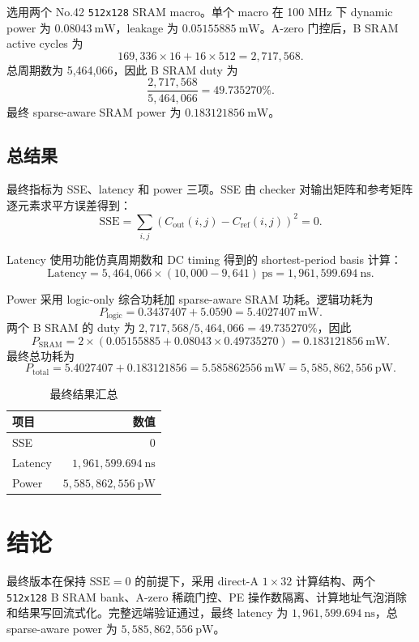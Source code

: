 \documentclass[UTF8,a4paper,zihao=-4]{ctexart}
\begin{document}
选用两个 No.42 \texttt{512x128} SRAM macro。单个 macro 在 100 MHz 下 dynamic power 为 $0.08043\ \mathrm{mW}$，leakage 为 $0.05155885\ \mathrm{mW}$。A-zero 门控后，B SRAM active cycles 为
\begin{equation}
  169{,}336\times16 + 16\times512 = 2{,}717{,}568.
\end{equation}
总周期数为 5,464,066，因此 B SRAM duty 为
\begin{equation}
  \frac{2{,}717{,}568}{5{,}464{,}066} = 49.735270\%.
\end{equation}
最终 sparse-aware SRAM power 为 $0.183121856\ \mathrm{mW}$。

\subsection{总结果}

最终指标为 SSE、latency 和 power 三项。SSE 由 checker 对输出矩阵和参考矩阵逐元素求平方误差得到：
\begin{equation}
  \mathrm{SSE}=\sum_{i,j}\left(C_{\mathrm{out}}(i,j)-C_{\mathrm{ref}}(i,j)\right)^2=0.
\end{equation}

Latency 使用功能仿真周期数和 DC timing 得到的 shortest-period basis 计算：
\begin{equation}
  \mathrm{Latency}=5{,}464{,}066\times(10{,}000-9{,}641)\ \mathrm{ps}
  =1{,}961{,}599.694\ \mathrm{ns}.
\end{equation}

Power 采用 logic-only 综合功耗加 sparse-aware SRAM 功耗。逻辑功耗为
\begin{equation}
  P_{\mathrm{logic}}=0.3437407+5.0590=5.4027407\ \mathrm{mW}.
\end{equation}
两个 B SRAM 的 duty 为 $2{,}717{,}568/5{,}464{,}066=49.735270\%$，因此
\begin{equation}
  P_{\mathrm{SRAM}}=2\times\left(0.05155885+0.08043\times0.49735270\right)
  =0.183121856\ \mathrm{mW}.
\end{equation}
最终总功耗为
\begin{equation}
  P_{\mathrm{total}}=5.4027407+0.183121856=5.585862556\ \mathrm{mW}
  =5{,}585{,}862{,}556\ \mathrm{pW}.
\end{equation}

\begin{table}[htbp]
\centering
\caption{最终结果汇总}
\begin{tabular}{lr}
\toprule
项目 & 数值 \\
\midrule
SSE & 0 \\
Latency & $1{,}961{,}599.694\ \mathrm{ns}$ \\
Power & $5{,}585{,}862{,}556\ \mathrm{pW}$ \\
\bottomrule
\end{tabular}
\end{table}

\section{结论}

最终版本在保持 $\mathrm{SSE}=0$ 的前提下，采用 direct-A $1\times32$ 计算结构、两个 \texttt{512x128} B SRAM bank、A-zero 稀疏门控、PE 操作数隔离、计算地址气泡消除和结果写回流式化。完整远端验证通过，最终 latency 为 $1{,}961{,}599.694\ \mathrm{ns}$，总 sparse-aware power 为 $5{,}585{,}862{,}556\ \mathrm{pW}$。
\end{document}
